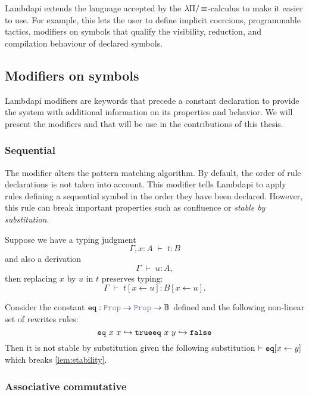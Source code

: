 Lambdapi extends the language accepted by the $\lambda\Pi/\mathop{\equiv}$-calculus to make it easier to use.
For example, this lets the user to define implicit coercions, programmable tactics, modifiers on symbols that qualify the visibility, reduction, and compilation behaviour of declared symbols.

\subsection{Modifiers on symbols}
\label{sec:modifiers}

Lambdapi modifiers are keywords that precede a constant declaration to provide the system with additional information on its properties and behavior.
We will present the modifiers  and  that will be use in the contributions of this thesis.

\subsubsection{Sequential}
\label{ssec:sequential}

The modifier  alters the pattern matching algorithm.
By default, the order of rule declarations is not taken into account.
This modifier tells Lambdapi to apply rules defining a sequential symbol in the order they have been declared.
However, this rule can break important properties such as confluence or \emph{stable by substitution}.

\begin{lemma}\label{lem:stability}
Suppose we have a typing judgment
\[
  \Gamma, x : A \;\vdash\; t : B
\]
and also a derivation
\[
  \Gamma \;\vdash\; u : A ,
\]
then replacing $x$ by $u$ in $t$ preserves typing:
\[
  \Gamma \;\vdash\; t[x \leftarrow u] : B[x \leftarrow u] .
\]
\end{lemma}

\begin{example}
Consider the constant $\kw{eq}: \prop \ra \prop \ra \B$ defined  and the following non-linear set of rewrites rules:
\[
    \texttt{\upshape{eq}}~x~x \hookrightarrow \texttt{\upshape{true}}\\
    \texttt{\upshape{eq}}~x~y \hookrightarrow \texttt{\upshape{false}}
\]
Then it is not stable by substitution given the following substitution $\vdash\texttt{\upshape{eq}}[x \leftarrow y]$ which breaks \cref{lem:stability}.
\end{example}

\subsubsection{Associative commutative}\label{ssec:assoc}

